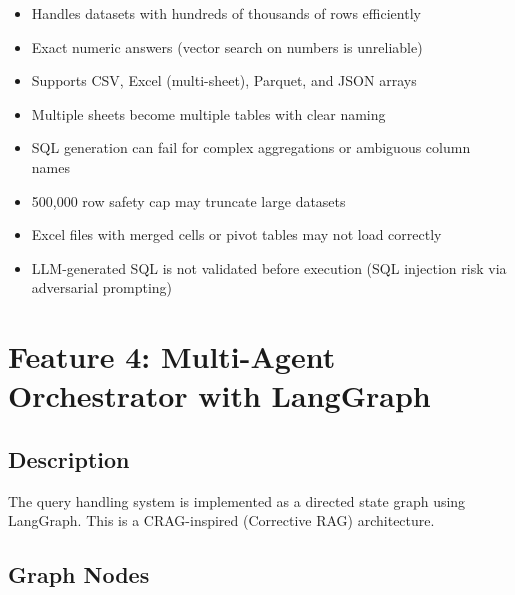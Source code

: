 \documentclass[12pt, a4paper, oneside]{report}
\begin{document}
\begin{probox}[Benefits]
\begin{itemize}
  \item Handles datasets with hundreds of thousands of rows efficiently
  \item Exact numeric answers (vector search on numbers is unreliable)
  \item Supports CSV, Excel (multi-sheet), Parquet, and JSON arrays
  \item Multiple sheets become multiple tables with clear naming
\end{itemize}
\end{probox}

\begin{conbox}[Drawbacks]
\begin{itemize}
  \item SQL generation can fail for complex aggregations or ambiguous column names
  \item 500,000 row safety cap may truncate large datasets
  \item Excel files with merged cells or pivot tables may not load correctly
  \item LLM-generated SQL is not validated before execution (SQL injection risk via adversarial prompting)
\end{itemize}
\end{conbox}

\section{Feature 4: Multi-Agent Orchestrator with LangGraph}

\subsection*{Description}
The query handling system is implemented as a directed state graph using LangGraph. This is a
CRAG-inspired (Corrective RAG) architecture.

\subsection*{Graph Nodes}
\end{document}
